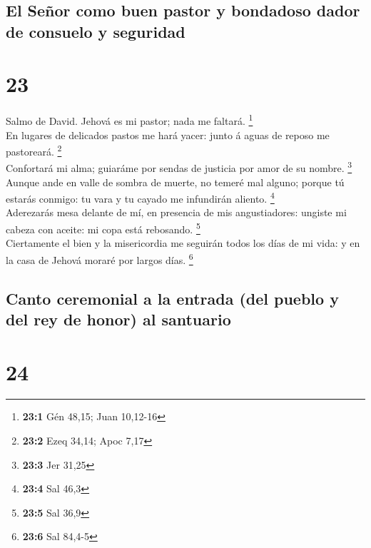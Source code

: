 \hypertarget{el-seuxf1or-como-buen-pastor-y-bondadoso-dador-de-consuelo-y-seguridad}{%
\subsection{El Señor como buen pastor y bondadoso dador de consuelo y
seguridad}\label{el-seuxf1or-como-buen-pastor-y-bondadoso-dador-de-consuelo-y-seguridad}}

\hypertarget{section-22}{%
\section{23}\label{section-22}}

 Salmo de David. Jehová es mi pastor; nada me faltará.
\footnote{\textbf{23:1} Gén 48,15; Juan 10,12-16}\\
 En lugares de delicados pastos me hará yacer: junto á
aguas de reposo me pastoreará. \footnote{\textbf{23:2} Ezeq 34,14; Apoc
  7,17}\\
 Confortará mi alma; guiaráme por sendas de justicia por
amor de su nombre. \footnote{\textbf{23:3} Jer 31,25}\\
 Aunque ande en valle de sombra de muerte, no temeré mal
alguno; porque tú estarás conmigo: tu vara y tu cayado me infundirán
aliento. \footnote{\textbf{23:4} Sal 46,3}\\
 Aderezarás mesa delante de mí, en presencia de mis
angustiadores: ungiste mi cabeza con aceite: mi copa está rebosando.
\footnote{\textbf{23:5} Sal 36,9}\\
 Ciertamente el bien y la misericordia me seguirán todos
los días de mi vida: y en la casa de Jehová moraré por largos días.
\footnote{\textbf{23:6} Sal 84,4-5}

\hypertarget{canto-ceremonial-a-la-entrada-del-pueblo-y-del-rey-de-honor-al-santuario}{%
\subsection{Canto ceremonial a la entrada (del pueblo y del rey de
honor) al
santuario}\label{canto-ceremonial-a-la-entrada-del-pueblo-y-del-rey-de-honor-al-santuario}}

\hypertarget{section-23}{%
\section{24}\label{section-23}}

